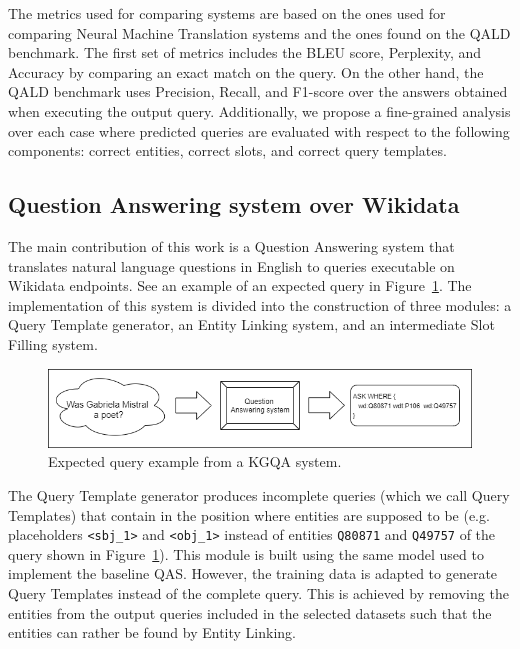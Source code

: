 The metrics used for comparing systems are based on the ones used for comparing Neural 
Machine Translation systems and the ones found on the QALD benchmark. The first set of 
metrics includes the BLEU score, Perplexity, and Accuracy by comparing an exact match on 
the \SPARQL{} query. On the other hand, the QALD benchmark uses Precision, Recall, and F1-score 
over the answers obtained when executing the output \SPARQL{} query. Additionally, 
we propose a fine-grained analysis over each case where predicted queries are evaluated with 
respect to the following components: correct entities, correct slots, and correct query 
templates.

\subsection*{Question Answering system over Wikidata}
\label{cap1:intro/contributions/qaWikidata}

The main contribution of this work is a Question Answering system that translates 
natural language questions in English to \SPARQL{} queries executable on Wikidata endpoints. See an
example of an expected \SPARQL{} query in Figure~\ref{fig:introQAexample}. The implementation of this 
system is divided into the construction of three modules: a Query Template generator, 
an Entity Linking system, and an intermediate Slot Filling system. 

\begin{figure}[!h]
    \centering
    \includegraphics[scale=.5]{imagenes/1_intro/introQuestionAnsweringExample.png}
    \caption{Expected \SPARQL{} query example from a KGQA system.}
    \label{fig:introQAexample}
\end{figure}

The Query Template generator produces incomplete \SPARQL{} queries (which we call 
Query Templates) that contain  in the position where entities are 
supposed to be (e.g. placeholders \texttt{<sbj\_1>} and \texttt{<obj\_1>} instead of entities 
\texttt{Q80871} and \texttt{Q49757} of the query shown in Figure~\ref{fig:introQAexample}). 
This module is built using the same model used to implement the baseline QAS. 
However, the training data is adapted to generate Query Templates instead of the complete 
query. This is achieved by removing the entities from the output \SPARQL{} queries included 
in the selected datasets such that the entities can rather be found by Entity Linking.

